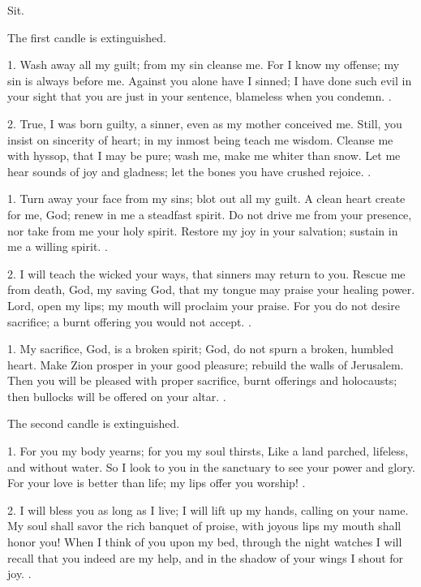 \begin{rubric}
  Sit.

  The first candle is extinguished.
\end{rubric}




1. Wash away all my guilt; from my sin cleanse me. For I know my offense; my
sin is always before me. Against you alone have I sinned; I have done such evil
in your sight that you are just in your sentence, blameless when you condemn.
\RBar.

2. True, I was born guilty, a sinner, even as my mother conceived me. Still,
you insist on sincerity of heart; in my inmost being teach me wisdom. Cleanse
me with hyssop, that I may be pure; wash me, make me whiter than snow. Let me
hear sounds of joy and gladness; let the bones you have crushed rejoice. \RBar.

1. Turn away your face from my sins; blot out all my guilt. A clean heart
create for me, God; renew in me a steadfast spirit. Do not drive me from your
presence, nor take from me your holy spirit. Restore my joy in your salvation;
sustain in me a willing spirit. \RBar.

2. I will teach the wicked your ways, that sinners may return to you. Rescue me
from death, God, my saving God, that my tongue may praise your healing power.
Lord, open my lips; my mouth will proclaim your praise. For you do not desire
sacrifice; a burnt offering you would not accept. \RBar.

1. My sacrifice, God, is a broken spirit; God, do not spurn a broken, humbled
heart. Make Zion prosper in your good pleasure; rebuild the walls of Jerusalem.
Then you will be pleased with proper sacrifice, burnt offerings and holocausts;
then bullocks will be offered on your altar. \RBar.

\begin{rubric}
  The second candle is extinguished.
\end{rubric}




1. For you my body yearns; for you my soul thirsts, Like a land parched,
lifeless, and without water. So I look to you in the sanctuary to see your
power and glory. For your love is better than life; my lips offer you worship!
\RBar.

2. I will bless you as long as I live; I will lift up my hands, calling on your
name. My soul shall savor the rich banquet of proise, with joyous lips my mouth
shall honor you! When I think of you upon my bed, through the night watches I
will recall that you indeed are my help, and in the shadow of your wings I
shout for joy. \RBar.


